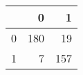 \begin{tabular}{lrr}
\toprule
{} &    0 &    1 \\
\midrule
0 &  180 &   19 \\
1 &    7 &  157 \\
\bottomrule
\end{tabular}
